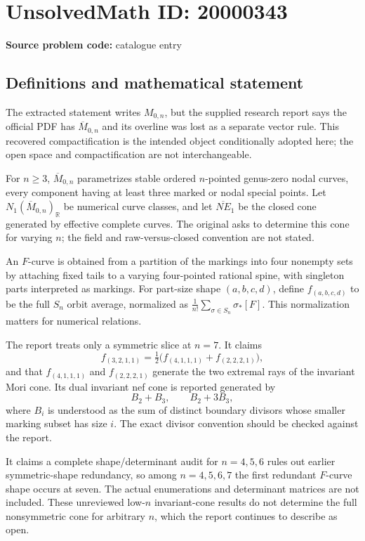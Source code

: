 \documentclass[11pt]{article}
\newcommand{\R}{\mathbb{R}}
\begin{document}
\section*{UnsolvedMath ID: 20000343}
\textbf{Source problem code:} catalogue entry
\subsection{Definitions and mathematical statement}
The extracted statement writes $M_{0,n}$, but the supplied research report says the official PDF has $\overline M_{0,n}$ and its overline was lost as a separate vector rule. This recovered compactification is the intended object conditionally adopted here; the open space and compactification are not interchangeable.

For $n\geq3$, $\overline M_{0,n}$ parametrizes stable ordered $n$-pointed genus-zero nodal curves, every component having at least three marked or nodal special points. Let $N_1(\overline M_{0,n})_{\R}$ be numerical curve classes, and let $\overline{NE}_1$ be the closed cone generated by effective complete curves. The original asks to determine this cone for varying $n$; the field and raw-versus-closed convention are not stated.

An $F$-curve is obtained from a partition of the markings into four nonempty sets by attaching fixed tails to a varying four-pointed rational spine, with singleton parts interpreted as markings. For part-size shape $(a,b,c,d)$, define $f_{(a,b,c,d)}$ to be the full $S_n$ orbit average, normalized as $\frac1{n!}\sum_{\sigma\in S_n}\sigma_*[F]$. This normalization matters for numerical relations.

The report treats only a symmetric slice at $n=7$. It claims
\[
 f_{(3,2,1,1)}=\tfrac12\bigl(f_{(4,1,1,1)}+f_{(2,2,2,1)}\bigr),
\]
and that $f_{(4,1,1,1)}$ and $f_{(2,2,2,1)}$ generate the two extremal rays of the invariant Mori cone. Its dual invariant nef cone is reported generated by
\[
 B_2+B_3,\qquad B_2+3B_3,
\]
where $B_i$ is understood as the sum of distinct boundary divisors whose smaller marking subset has size $i$. The exact divisor convention should be checked against the report.

It claims a complete shape/determinant audit for $n=4,5,6$ rules out earlier symmetric-shape redundancy, so among $n=4,5,6,7$ the first redundant $F$-curve shape occurs at seven. The actual enumerations and determinant matrices are not included. These unreviewed low-$n$ invariant-cone results do not determine the full nonsymmetric cone for arbitrary $n$, which the report continues to describe as open.
\end{document}

